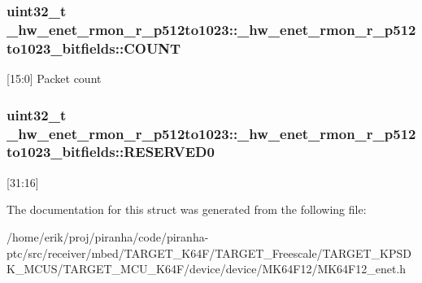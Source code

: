 \subsubsection[{\texorpdfstring{C\+O\+U\+NT}{COUNT}}]{\setlength{\rightskip}{0pt plus 5cm}uint32\+\_\+t \+\_\+hw\+\_\+enet\+\_\+rmon\+\_\+r\+\_\+p512to1023\+::\+\_\+hw\+\_\+enet\+\_\+rmon\+\_\+r\+\_\+p512to1023\+\_\+bitfields\+::\+C\+O\+U\+NT}\hypertarget{struct__hw__enet__rmon__r__p512to1023_1_1__hw__enet__rmon__r__p512to1023__bitfields_a95c08120f8bd2bdad4a78122275e61b5}{}\label{struct__hw__enet__rmon__r__p512to1023_1_1__hw__enet__rmon__r__p512to1023__bitfields_a95c08120f8bd2bdad4a78122275e61b5}
\mbox{[}15\+:0\mbox{]} Packet count 
\subsubsection[{\texorpdfstring{R\+E\+S\+E\+R\+V\+E\+D0}{RESERVED0}}]{\setlength{\rightskip}{0pt plus 5cm}uint32\+\_\+t \+\_\+hw\+\_\+enet\+\_\+rmon\+\_\+r\+\_\+p512to1023\+::\+\_\+hw\+\_\+enet\+\_\+rmon\+\_\+r\+\_\+p512to1023\+\_\+bitfields\+::\+R\+E\+S\+E\+R\+V\+E\+D0}\hypertarget{struct__hw__enet__rmon__r__p512to1023_1_1__hw__enet__rmon__r__p512to1023__bitfields_a9c9b5dd96f3eb5599ae352cc9f301512}{}\label{struct__hw__enet__rmon__r__p512to1023_1_1__hw__enet__rmon__r__p512to1023__bitfields_a9c9b5dd96f3eb5599ae352cc9f301512}
\mbox{[}31\+:16\mbox{]} 

The documentation for this struct was generated from the following file\+:\begin{DoxyCompactItemize}
\item 
/home/erik/proj/piranha/code/piranha-\/ptc/src/receiver/mbed/\+T\+A\+R\+G\+E\+T\+\_\+\+K64\+F/\+T\+A\+R\+G\+E\+T\+\_\+\+Freescale/\+T\+A\+R\+G\+E\+T\+\_\+\+K\+P\+S\+D\+K\+\_\+\+M\+C\+U\+S/\+T\+A\+R\+G\+E\+T\+\_\+\+M\+C\+U\+\_\+\+K64\+F/device/device/\+M\+K64\+F12/M\+K64\+F12\+\_\+enet.\+h\end{DoxyCompactItemize}
